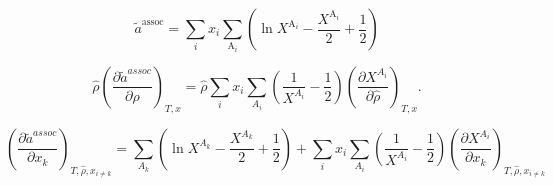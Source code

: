 \documentclass[12pt, letterpaper]{article}
\begin{document}

\begin{equation}
    \tilde{a}^{\mathrm{assoc}}= \sum_{i} x_{i}\sum_{\mathrm{A}_{i}}\left(\ln X^{\mathrm{A}_{i}}-\frac{X^{\mathrm{A}_{i}}}{2}+\frac{1}{2}\right)
    \label{eq:ares_assoc}
\end{equation}



\begin{equation}
    \hat{\rho}\left(\frac{\partial\tilde{a}^{assoc}}{\partial\hat{\rho}}\right)_{T,x}
    =\hat{\rho}\sum_{i}x_{i}\sum_{A_{i}}\left(\frac{1}{X^{A_{i}}}-\frac{1}{2}\right)\left(\frac{\partial X^{A_{i}}}{\partial\hat{\rho}}\right)_{T,x}.
    \label{eq:assoc_ares_dadrho}
\end{equation}


\begin{equation}
    \left(\frac{\partial \tilde a^{assoc}}{\partial x_{k}}\right)_{T,\hat{\rho},x_{i\neq k}}
    =
    \sum_{A_{k}}\left(\ln X^{A_{k}}-\frac{X^{A_{k}}}{2}+\frac{1}{2}\right)
    +
    \sum_{i} x_{i}\sum_{A_{i}}
    \left(\frac{1}{X^{A_{i}}}-\frac{1}{2}\right)
    \left(\frac{\partial X^{A_{i}}}{\partial x_{k}}\right)_{T,\hat{\rho},x_{i\neq k}}
    \label{eq:assoc_ares_dxk}
\end{equation}

\end{document}
